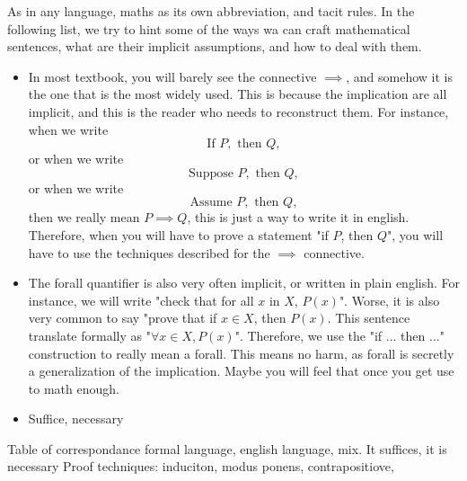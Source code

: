 As in any language, maths as its own abbreviation, and tacit rules. In the following list, we try to hint some of the ways wa can craft mathematical sentences, what are their implicit assumptions, and how to deal with them.
\begin{itemize}
    \item In most textbook, you will barely see the connective \( \implies \), and somehow it is the one that is the most widely used. This is because the implication are all implicit, and this is the reader who needs to reconstruct them. For instance, when we write
    \begin{equation*}
        \text{If } P, \text{ then }Q,
    \end{equation*}
    or when we write
    \begin{equation*}
        \text{Suppose } P, \text{ then }Q,
    \end{equation*}
    or when we write
    \begin{equation*}
        \text{Assume } P, \text{ then }Q,
    \end{equation*}
    then we really mean \( P \implies Q \), this is just a way to write it in english. Therefore, when you will have to prove a statement "if \( P \), then \( Q \)", you will have to use the techniques described for the \( \implies \) connective.

    \item The forall quantifier is also very often implicit, or written in plain english. For instance, we will write "check that for all \( x \) in \( X \), \( P(x) \)". Worse, it is also very common to say "prove that if \( x \in X \), then \( P(x) \). This sentence translate formally as "\( \forall x \in X, P(x) \)". Therefore, we use the "if ... then ..." construction to really mean a forall. This means no harm, as forall is secretly a generalization of the implication. Maybe you will feel that once you get use to math enough. 
    
    \item Suffice, necessary
\end{itemize}

Table of correspondance formal language, english language, mix. It suffices, it is necessary
Proof techniques: induciton, modus ponens, contrapositiove, 
